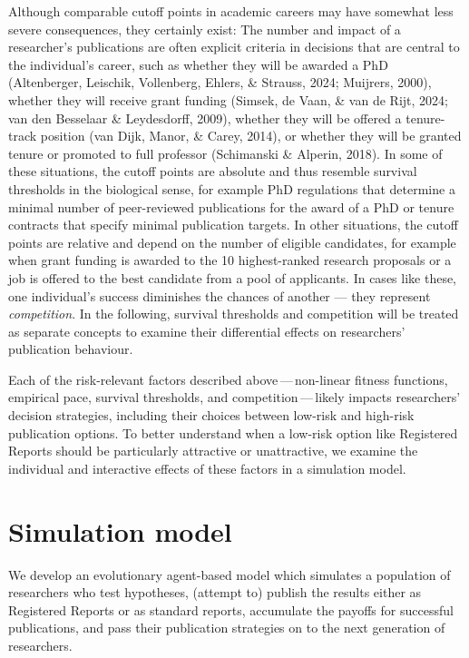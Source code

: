 \documentclass[
  british,
  a4paper,
  ,man,mask,floatsintext]{apa6}
\begin{document}
Although comparable cutoff points in academic careers may have somewhat less severe consequences, they certainly exist:
The number and impact of a researcher's publications are often explicit criteria in decisions that are central to the individual's career, such as whether they will be awarded a PhD (Altenberger, Leischik, Vollenberg, Ehlers, \& Strauss, 2024; Muijrers, 2000), whether they will receive grant funding (Simsek, de Vaan, \& van de Rijt, 2024; van den Besselaar \& Leydesdorff, 2009), whether they will be offered a tenure-track position (van Dijk, Manor, \& Carey, 2014), or whether they will be granted tenure or promoted to full professor (Schimanski \& Alperin, 2018).
In some of these situations, the cutoff points are absolute and thus resemble survival thresholds in the biological sense, for example PhD regulations that determine a minimal number of peer-reviewed publications for the award of a PhD or tenure contracts that specify minimal publication targets.
In other situations, the cutoff points are relative and depend on the number of eligible candidates, for example when grant funding is awarded to the 10 highest-ranked research proposals or a job is offered to the best candidate from a pool of applicants.
In cases like these, one individual's success diminishes the chances of another --- they represent \emph{competition}.
In the following, survival thresholds and competition will be treated as separate concepts to examine their differential effects on researchers' publication behaviour.

Each of the risk-relevant factors described above\(\,\)---\(\,\)non-linear fitness functions, empirical pace, survival thresholds, and competition\(\,\)---\(\,\)likely impacts researchers' decision strategies, including their choices between low-risk and high-risk publication options.
To better understand when a low-risk option like Registered Reports should be particularly attractive or unattractive, we examine the individual and interactive effects of these factors in a simulation model.

\section{Simulation model}\label{simulation-model}

We develop an evolutionary agent-based model which simulates a population of researchers who test hypotheses, (attempt to) publish the results either as Registered Reports or as standard reports, accumulate the payoffs for successful publications, and pass their publication strategies on to the next generation of researchers.
\end{document}
